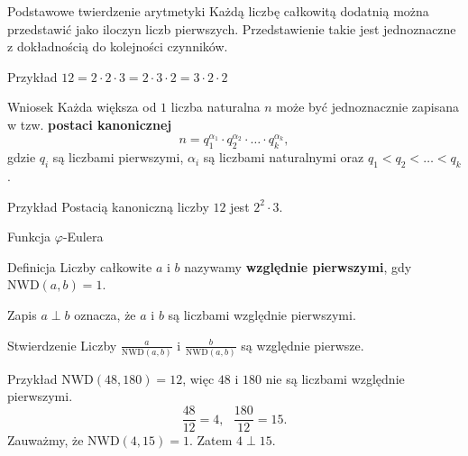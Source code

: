 \documentclass[a4paper,10pt]{beamer}
\begin{document}
\begin{frame}
	
	\begin{block}{Podstawowe twierdzenie arytmetyki}
		Każdą liczbę całkowitą dodatnią można przedstawić jako iloczyn liczb pierwszych. Przedstawienie takie jest jednoznaczne z dokładnością do kolejności czynników.
	\end{block}

	\begin{exampleblock}{Przykład}
		$12=2\cdot2\cdot3=2\cdot3\cdot2=3\cdot2\cdot2$
	\end{exampleblock}
	
	\begin{block}{Wniosek}
		Każda większa od $1$ liczba naturalna $n$ może być jednoznacznie zapisana w tzw. {\bf postaci kanonicznej}
		$$n=q_{1}^{\alpha_{1}}\cdot q_{2}^{\alpha_{2}}\cdot\ldots\cdot q_{k}^{\alpha_{k}},$$
		gdzie $q_{i}$ są liczbami pierwszymi, $\alpha_i$ są liczbami naturalnymi oraz $q_1<q_2<\ldots<q_k$.
	\end{block}

	\begin{exampleblock}{Przykład}
	Postacią kanoniczną liczby $12$ jest $2^2\cdot3$.
	\end{exampleblock}
	
\end{frame}




\begin{frame}{Funkcja $\varphi$-Eulera}
	
	\begin{block}{Definicja}
		Liczby całkowite $a$ i $b$ nazywamy {\bf względnie pierwszymi}, gdy $\mbox{NWD}(a,b)=1$. 
	\end{block}
	
	\begin{block}{}
		Zapis $a\perp b$ oznacza, że $a$ i $b$ są liczbami względnie pierwszymi.
	\end{block}

	\begin{block}{Stwierdzenie}
		Liczby $\displaystyle\frac{a}{\mbox{NWD}(a,b)}$ i $\displaystyle\frac{b}{\mbox{NWD}(a,b)}$ są względnie pierwsze.
	\end{block}

	\begin{exampleblock}{Przykład}
		$\mbox{NWD}(48,180)=12$, więc $48$ i $180$ nie są liczbami względnie pierwszymi.
		$$\frac{48}{12}=4,\ \ \ \frac{180}{12}=15.$$
		Zauważmy, że $\mbox{NWD}(4,15)=1$. Zatem $4\perp15$.
	\end{exampleblock}
	
\end{frame}
\end{document}
